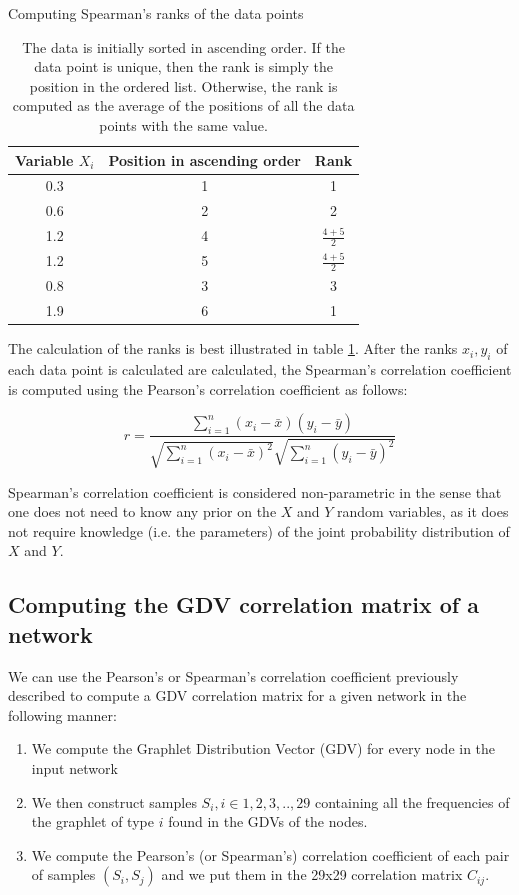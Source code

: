 \begin{table}
  \centering
  Computing Spearman's ranks of the data points\\
  \begin{tabular}{ | c | c | c |}
    \hline
    \cellcolor{blue3} Variable $X_i$ & \cellcolor{blue3} Position in ascending
order & \cellcolor{blue3} Rank\\
    \hline
    0.3 & 1 & 1\\
    \hline
    0.6 & 2 & 2\\
    \hline
    1.2 & 4 & $ \frac{4+5}{2} $\\
    \hline
    1.2 & 5 & $ \frac{4+5}{2} $\\
    \hline
    0.8 & 3 & 3\\
    \hline
    1.9 & 6 & 1\\
    \hline
  \end{tabular}
  \caption{The data is initially sorted in ascending order. If the data point is
unique, then the rank is simply the position in the ordered list. Otherwise,
the rank is computed as the average of the positions of all the data points
with the same value.}
  \label{tab:ranks_table}
\end{table}

The calculation of the ranks is best illustrated in table \ref{tab:ranks_table}.
After the ranks $ x_i, y_i $ of each data point is calculated are calculated,
the Spearman's correlation coefficient is computed using the Pearson's
correlation coefficient as follows:

\begin{equation}
 r = \frac{\sum_{i=1}^{n}(x_i - \bar{x})(y_i -
\bar{y})}{\sqrt{\sum_{i=1}^{n}\left(x_i -
\bar{x}\right)^2}\sqrt{\sum_{i=1}^{n}\left(y_i -
\bar{y}\right)^2}} 
\end{equation}

Spearman's correlation coefficient is considered non-parametric in the sense
that one does not need to know any prior on the $X$ and $Y$ random variables, as
it does not require knowledge (i.e. the parameters) of the joint probability
distribution of $X$ and $Y$.

\subsection{Computing the GDV correlation matrix of a network}

We can use the Pearson's or Spearman's correlation coefficient previously
described to compute a GDV correlation matrix for a given network in the
following manner:
\begin{enumerate}
 \item We compute the Graphlet Distribution Vector (GDV) for every node in the
input network
 \item We then construct samples $ S_i, i\in {1,2,3, .. ,29} $
containing all the frequencies of the graphlet of type $i$ found in the GDVs of
the nodes.
 \item We compute the Pearson's (or Spearman's) correlation coefficient of each
pair of samples $ (S_i, S_j) $ and we put them in the 29x29 correlation matrix $
C_{ij} $.
\end{enumerate}

